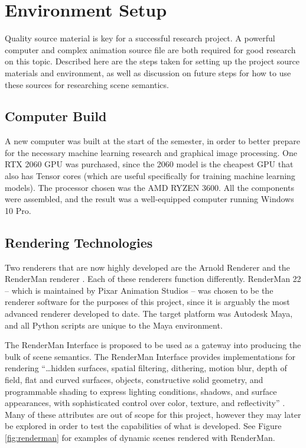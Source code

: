 \documentclass[conference]{IEEEtran}
\begin{document}
\section{Environment Setup}
Quality source material is key for a successful research project.
A powerful computer and complex animation source file are both required
for good research on this topic.
Described here are the steps taken for setting up the project
source materials and environment, as well as discussion on future steps
for how to use these sources for researching scene semantics.

\subsection{Computer Build}
A new computer was built at the start of the semester, in order to better prepare for the necessary machine learning
research and graphical image processing. One RTX 2060 GPU was purchased,
since the 2060 model is the cheapest GPU that also has Tensor cores
(which are useful specifically for training machine learning models).
The processor chosen was the AMD RYZEN 3600.
All the components were assembled,
and the result was a well-equipped computer running Windows 10 Pro.

\subsection{Rendering Technologies}
Two renderers that are now highly developed are the Arnold Renderer \cite{arnold}
and the RenderMan renderer \cite{renderman_docs}. Each of these renderers
function differently.
RenderMan 22 -- which is maintained by Pixar Animation Studios --
was chosen to be the renderer software for the purposes of this project,
since it is arguably the most advanced renderer developed to date.
The target platform was Autodesk Maya, and all Python scripts are unique to the
Maya environment.

The RenderMan Interface is proposed to be used as a gateway
into producing the bulk of scene semantics.
The RenderMan Interface provides implementations for rendering
``\dots hidden surfaces, spatial filtering, dithering, motion blur, depth of field,
flat and curved surfaces, objects, constructive solid geometry,
and programmable shading to express lighting conditions, shadows, and surface appearances,
with sophisticated control over color, texture, and reflectivity''
\cite{renderman_docs}.
Many of these attributes are out of scope
for this project, however they may later be explored in order to test the capabilities
of what is developed.
See Figure \ref{fig:renderman} for examples of dynamic scenes rendered with RenderMan.
\end{document}
